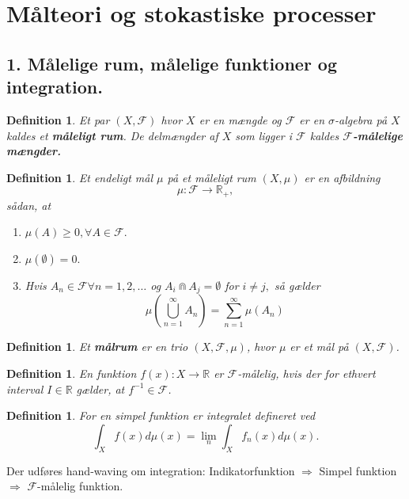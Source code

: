 \documentclass[12pt]{report}
\newtheorem{definition}[lemma]{Definition}
\theoremstyle{break}
\theoremstyle{break}
\newcommand{\RR}{\mathbb{R}}
\newcommand{\FI}{\mathcal{F}}
\newcommand{\1}{\mathds{1}}
\begin{document}
\chapter*{Målteori og stokastiske processer}
\section*{1. Målelige rum, målelige funktioner og integration.}
\begin{definition}
	Et par $(X,\FI)$ hvor $X$ er en mængde og $\FI$ er en $\sigma$-algebra på $X$ kaldes et {\bf måleligt rum}. De delmængder af $X$ som ligger i $\FI$ kaldes  {\bf $\FI$-målelige mængder.}
\end{definition}
\begin{definition}
	Et endeligt mål $\mu$ på et måleligt rum $(X,\mu)$ er en afbildning
	\[\mu \colon \FI \to \RR_+, \]
	sådan, at
	\begin{enumerate}
		\item $ \mu (A) \geq 0, \forall A \in \FI .$
		\item $ \mu(\emptyset)=0. $
		\item Hvis $A_n \in \FI \forall n=1,2,\dots$ og $A_i \Cap A_j = \emptyset$ for $i\neq j,$ så gælder
		\[ \mu \left( \bigcup^\infty_{n=1}A_n \right)=\sum\limits_{n=1}^{\infty}\mu \left( A_n \right) \]
	\end{enumerate}
\end{definition}
\begin{definition}
	Et {\bf målrum} er en trio $(X,\FI,\mu)$, hvor $\mu$ er et mål på $(X,\FI)$.
\end{definition}
\begin{definition}
	En funktion $f(x) \colon X\to \RR$ er $\FI$-målelig, hvis der for ethvert interval $I\in \RR$ gælder, at $f^{-1}\in \FI$.
\end{definition}
\begin{definition}
	For en simpel funktion er integralet defineret ved
	\[ \int_{X} f(x)d\mu(x)=\lim\limits_{n} \int_{X}f_n(x)d\mu(x).\]
\end{definition}

Der udføres hand-waving om integration: Indikatorfunktion $\Rightarrow$ Simpel funktion $\Rightarrow$ $\FI$-målelig funktion.
\end{document}
